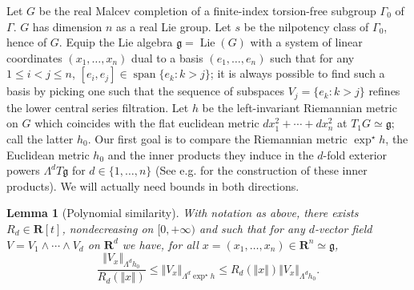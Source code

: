 \documentclass[12pt]{amsart}
\newtheorem{lem}[prop]{Lemma}
\theoremstyle{definition}
\begin{document}
Let $G$ be the real Malcev completion of a finite-index torsion-free subgroup $\Gamma_0$ of $\Gamma$. $G$ has dimension $n$ as a real Lie group. Let $s$ be the nilpotency class of $\Gamma_0$, hence of $G$. Equip the Lie algebra $\mathfrak g = \operatorname{Lie}(G)$ with a system of linear coordinates $(x_1,\ldots, x_n)$ dual to a basis $(e_1,\ldots, e_n)$ such that for any $1\leqslant i < j \leqslant n$, $[e_i,e_j] \in \operatorname{span}\{ e_k \colon k > j \}$; it is always possible to find such a basis by picking one such that the sequence of subspaces $V_j = \{ e_k: k >j \}$ refines the lower central series filtration. Let $h$ be the left-invariant Riemannian metric on $G$ which coincides with the flat euclidean metric $dx_1^2 + \cdots + dx_n^2$ at $T_1G \simeq \mathfrak g$; call the latter $h_0$.
Our first goal is to compare the Riemannian metric $\exp^\star h$, the Euclidean metric $h_0$ and the inner products they induce in the $d$-fold exterior powers $\Lambda^d T \mathfrak g$ for $d \in \{1, \ldots,  n\}$ (See e.g. \cite[1.7.5]{FedGMT} for the construction of these inner products).
We will actually need bounds in both directions.

\begin{lem}[Polynomial similarity]
\label{lem:bounding-simple-vectors}
With notation as above, there exists $R_d\in \mathbf R[t]$, nondecreasing on $[0,+\infty)$ and such that for any $d$-vector field $V = V_1 \wedge \cdots \wedge V_d$ on $\mathbf R^d$ we have, for all $x = (x_1,\ldots, x_n) \in \mathbf R^n \simeq \mathfrak g$,
\begin{equation}
\label{eq:bounding-simple-vectors}
\frac{\Vert V_{x} \Vert_{\Lambda^dh_0}}{R_d (\Vert x \Vert)}
    \leqslant \Vert  V_{x} \Vert_{\Lambda^d \exp^\star h} \leqslant R_d (\Vert x \Vert) \Vert  V_{x} \Vert_{\Lambda^d h_0}.
\end{equation}    
\end{lem}
\end{document}
